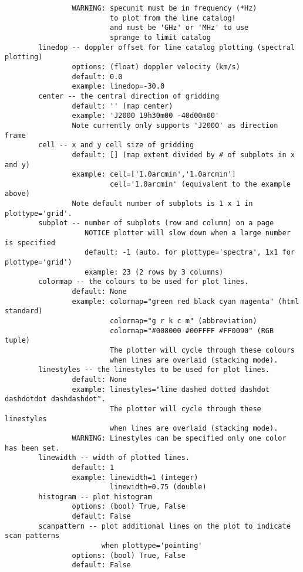 \begin{verbatim}
                WARNING: specunit must be in frequency (*Hz)
                         to plot from the line catalog!
                         and must be 'GHz' or 'MHz' to use
                         sprange to limit catalog
        linedop -- doppler offset for line catalog plotting (spectral plotting)
                options: (float) doppler velocity (km/s)
                default: 0.0
                example: linedop=-30.0
        center -- the central direction of gridding
                default: '' (map center)
                example: 'J2000 19h30m00 -40d00m00'
                Note currently only supports 'J2000' as direction frame
        cell -- x and y cell size of gridding
                default: [] (map extent divided by # of subplots in x and y)
                example: cell=['1.0arcmin','1.0arcmin']
                         cell='1.0arcmin' (equivalent to the example above)
                Note default number of subplots is 1 x 1 in plottype='grid'.
        subplot -- number of subplots (row and column) on a page
                   NOTICE plotter will slow down when a large number is specified
                   default: -1 (auto. for plottype='spectra', 1x1 for plottype='grid')
                   example: 23 (2 rows by 3 columns)
        colormap -- the colours to be used for plot lines. 
                default: None
                example: colormap="green red black cyan magenta" (html standard)
                         colormap="g r k c m" (abbreviation)
                         colormap="#008000 #00FFFF #FF0090" (RGB tuple)
                         The plotter will cycle through these colours 
                         when lines are overlaid (stacking mode).
        linestyles -- the linestyles to be used for plot lines. 
                default: None
                example: linestyles="line dashed dotted dashdot dashdotdot dashdashdot". 
                         The plotter will cycle through these linestyles 
                         when lines are overlaid (stacking mode). 
                WARNING: Linestyles can be specified only one color has been set. 
        linewidth -- width of plotted lines. 
                default: 1
                example: linewidth=1 (integer)
                         linewidth=0.75 (double)
        histogram -- plot histogram
                options: (bool) True, False
                default: False
        scanpattern -- plot additional lines on the plot to indicate scan patterns
                       when plottype='pointing'
                options: (bool) True, False
                default: False

\end{verbatim}

